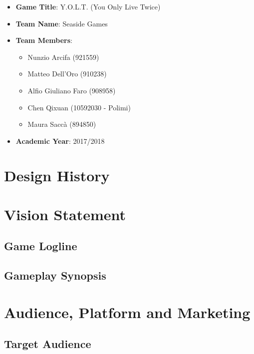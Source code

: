 \documentclass[12pt]{article}
\begin{document}
\vspace*{\fill}
\begin{itemize}
	\item \textbf{Game Title}: Y.O.L.T. (You Only Live Twice)
	\item \textbf{Team Name}: Seaside Games
	\item \textbf{Team Members}:
	\begin{itemize}
		\item Nunzio Arcifa (921559)
		\item Matteo Dell'Oro (910238)
		\item Alfio Giuliano Faro (908958)
		\item Chen Qixuan (10592030 - Polimi)
		\item Maura Saccà (894850)
	\end{itemize}
	\item \textbf{Academic Year}: 2017/2018
\end{itemize}
\vspace*{\fill}

\newpage

\tableofcontents

\newpage

\section{Design History}

\newpage

\section{Vision Statement}

\subsection{Game Logline}

\subsection{Gameplay Synopsis}

\newpage

\section{Audience, Platform and Marketing}

\subsection{Target Audience}
\end{document}
